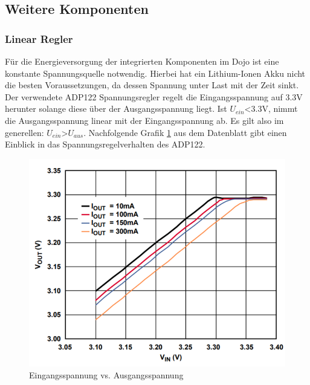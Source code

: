 \subsection{Weitere Komponenten}\label{sec:weitereKomponenten}


\subsubsection{Linear Regler}
Für die Energieversorgung der integrierten Komponenten im Dojo ist eine konstante Spannungsquelle notwendig. Hierbei hat ein Lithium-Ionen Akku nicht die besten Voraussetzungen, da dessen Spannung unter Last mit der Zeit sinkt. Der verwendete ADP122 Spannungsregler regelt die Eingangsspannung auf 3.3V herunter solange diese über der Ausgangsspannung liegt. Ist $U_{ein}$<3.3V, nimmt die Ausgangsspannung linear mit der Eingangsspannung ab. Es gilt also im generellen: $U_{ein}$>$U_{aus}$. Nachfolgende Grafik \ref{fig:Linearregler 3.3V} aus dem Datenblatt gibt einen Einblick in das Spannungsregelverhalten des ADP122.

\begin{figure}[H]
	\begin{center}
		\includegraphics[width=120mm]{data/Linearregler_3_3V.png}
		\caption[ADP 122 Linearregler Spannungsverhalten]{Eingangsspannung vs. Ausgangsspannung \cite{ADP122LinearRegulator}} %
		\label{fig:Linearregler 3.3V}
	\end{center}
\end{figure} 


